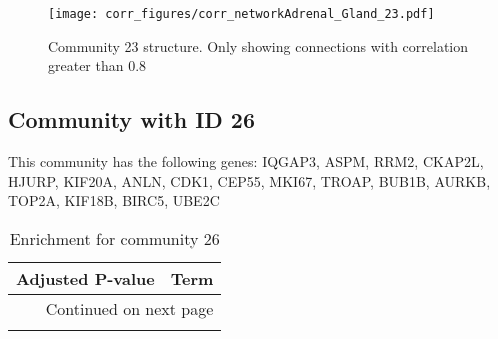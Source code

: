 \begin{figure}[h!]
\centering
\texttt{[image: corr\_figures/corr\_networkAdrenal\_Gland\_23.pdf]}
\caption{Community 23 structure. Only showing connections with correlation greater than 0.8}
\end{figure}




\subsection*{Community with ID 26}
This community has the following genes: IQGAP3, ASPM, RRM2, CKAP2L, HJURP, KIF20A, ANLN, CDK1, CEP55, MKI67, TROAP, BUB1B, AURKB, TOP2A, KIF18B, BIRC5, UBE2C
\\
\begin{longtable}{p{2.4cm}p{14.5cm}}
\caption{Enrichment for community 26}\\
\toprule
Adjusted \newline P-value &                                                                                                                                                   Term \\
\midrule
\endhead
\midrule
\multicolumn{2}{r}{{Continued on next page}} \\
\midrule
\endfoot


\end{longtable}
